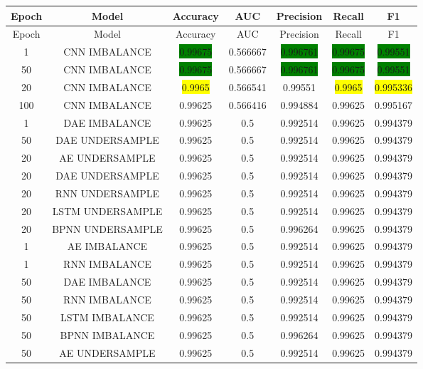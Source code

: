 \begin{longtable}{|c|c|c|c|c|c|c|}
	\hline
	Epoch & Model & Accuracy & AUC & Precision & Recall & F1\\ \hline
	\endfirsthead
	\hline
	Epoch & Model & Accuracy & AUC & Precision & Recall & F1\\ \hline
	\endhead
	1 & CNN IMBALANCE & \colorbox{green}{0.99675} & 0.566667 & \colorbox{green}{0.996761} & \colorbox{green}{0.99675} & \colorbox{green}{0.99551}\\ \hline
	50 & CNN IMBALANCE & \colorbox{green}{0.99675} & 0.566667 & \colorbox{green}{0.996761} & \colorbox{green}{0.99675} & \colorbox{green}{0.99551}\\ \hline
	20 & CNN IMBALANCE & \colorbox{yellow}{0.9965} & 0.566541 & 0.99551 & \colorbox{yellow}{0.9965} & \colorbox{yellow}{0.995336}\\ \hline
	100 & CNN IMBALANCE & 0.99625 & 0.566416 & 0.994884 & 0.99625 & 0.995167\\ \hline
	1 & DAE IMBALANCE & 0.99625 & 0.5 & 0.992514 & 0.99625 & 0.994379\\ \hline
	50 & DAE UNDERSAMPLE & 0.99625 & 0.5 & 0.992514 & 0.99625 & 0.994379\\ \hline
	20 & AE UNDERSAMPLE & 0.99625 & 0.5 & 0.992514 & 0.99625 & 0.994379\\ \hline
	20 & DAE UNDERSAMPLE & 0.99625 & 0.5 & 0.992514 & 0.99625 & 0.994379\\ \hline
	20 & RNN UNDERSAMPLE & 0.99625 & 0.5 & 0.992514 & 0.99625 & 0.994379\\ \hline
	20 & LSTM UNDERSAMPLE & 0.99625 & 0.5 & 0.992514 & 0.99625 & 0.994379\\ \hline
	20 & BPNN UNDERSAMPLE & 0.99625 & 0.5 & 0.996264 & 0.99625 & 0.994379\\ \hline
	1 & AE IMBALANCE & 0.99625 & 0.5 & 0.992514 & 0.99625 & 0.994379\\ \hline
	1 & RNN IMBALANCE & 0.99625 & 0.5 & 0.992514 & 0.99625 & 0.994379\\ \hline
	50 & DAE IMBALANCE & 0.99625 & 0.5 & 0.992514 & 0.99625 & 0.994379\\ \hline
	50 & RNN IMBALANCE & 0.99625 & 0.5 & 0.992514 & 0.99625 & 0.994379\\ \hline
	50 & LSTM IMBALANCE & 0.99625 & 0.5 & 0.992514 & 0.99625 & 0.994379\\ \hline
	50 & BPNN IMBALANCE & 0.99625 & 0.5 & 0.996264 & 0.99625 & 0.994379\\ \hline
	50 & AE UNDERSAMPLE & 0.99625 & 0.5 & 0.992514 & 0.99625 & 0.994379\\ \hline

\end{longtable}
